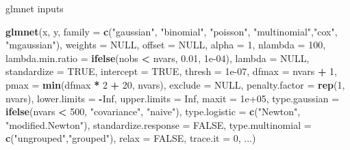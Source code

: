 \documentclass[
  ignorenonframetext,
]{beamer}
\newenvironment{Shaded}{\begin{snugshade}}{\end{snugshade}}
\newcommand{\DataTypeTok}[1]{\textcolor[rgb]{0.13,0.29,0.53}{#1}}
\newcommand{\DecValTok}[1]{\textcolor[rgb]{0.00,0.00,0.81}{#1}}
\newcommand{\FloatTok}[1]{\textcolor[rgb]{0.00,0.00,0.81}{#1}}
\newcommand{\KeywordTok}[1]{\textcolor[rgb]{0.13,0.29,0.53}{\textbf{#1}}}
\newcommand{\NormalTok}[1]{#1}
\newcommand{\OperatorTok}[1]{\textcolor[rgb]{0.81,0.36,0.00}{\textbf{#1}}}
\newcommand{\OtherTok}[1]{\textcolor[rgb]{0.56,0.35,0.01}{#1}}
\newcommand{\StringTok}[1]{\textcolor[rgb]{0.31,0.60,0.02}{#1}}
\begin{document}
\begin{frame}[fragile]

\begin{block}{glmnet inputs}

\begin{Shaded}
\begin{Highlighting}[]
\KeywordTok{glmnet}\NormalTok{(x, y, }
 \DataTypeTok{family =} \KeywordTok{c}\NormalTok{(}\StringTok{"gaussian"}\NormalTok{, }\StringTok{"binomial"}\NormalTok{, }\StringTok{"poisson"}\NormalTok{, }\StringTok{"multinomial"}\NormalTok{,}\StringTok{"cox"}\NormalTok{, }\StringTok{"mgaussian"}\NormalTok{),}
 \DataTypeTok{weights =} \OtherTok{NULL}\NormalTok{, }\DataTypeTok{offset =} \OtherTok{NULL}\NormalTok{, }\DataTypeTok{alpha =} \DecValTok{1}\NormalTok{, }\DataTypeTok{nlambda =} \DecValTok{100}\NormalTok{, }
 \DataTypeTok{lambda.min.ratio =} \KeywordTok{ifelse}\NormalTok{(nobs }\OperatorTok{<}\StringTok{ }\NormalTok{nvars, }\FloatTok{0.01}\NormalTok{, }\FloatTok{1e-04}\NormalTok{),}
 \DataTypeTok{lambda =} \OtherTok{NULL}\NormalTok{, }\DataTypeTok{standardize =} \OtherTok{TRUE}\NormalTok{, }\DataTypeTok{intercept =} \OtherTok{TRUE}\NormalTok{,}
 \DataTypeTok{thresh =} \FloatTok{1e-07}\NormalTok{, }\DataTypeTok{dfmax =}\NormalTok{ nvars }\OperatorTok{+}\StringTok{ }\DecValTok{1}\NormalTok{, }
 \DataTypeTok{pmax =} \KeywordTok{min}\NormalTok{(dfmax }\OperatorTok{*}\StringTok{ }\DecValTok{2} \OperatorTok{+}\StringTok{ }\DecValTok{20}\NormalTok{, nvars), }
 \DataTypeTok{exclude =} \OtherTok{NULL}\NormalTok{, }\DataTypeTok{penalty.factor =} \KeywordTok{rep}\NormalTok{(}\DecValTok{1}\NormalTok{, nvars),}
 \DataTypeTok{lower.limits =} \OperatorTok{-}\OtherTok{Inf}\NormalTok{, }\DataTypeTok{upper.limits =} \OtherTok{Inf}\NormalTok{, }\DataTypeTok{maxit =} \FloatTok{1e+05}\NormalTok{,}
 \DataTypeTok{type.gaussian =} \KeywordTok{ifelse}\NormalTok{(nvars }\OperatorTok{<}\StringTok{ }\DecValTok{500}\NormalTok{, }\StringTok{"covariance"}\NormalTok{, }\StringTok{"naive"}\NormalTok{),}
 \DataTypeTok{type.logistic =} \KeywordTok{c}\NormalTok{(}\StringTok{"Newton"}\NormalTok{, }\StringTok{"modified.Newton"}\NormalTok{),}
 \DataTypeTok{standardize.response =} \OtherTok{FALSE}\NormalTok{, }
 \DataTypeTok{type.multinomial =} \KeywordTok{c}\NormalTok{(}\StringTok{"ungrouped"}\NormalTok{,}\StringTok{"grouped"}\NormalTok{), }
 \DataTypeTok{relax =} \OtherTok{FALSE}\NormalTok{, }\DataTypeTok{trace.it =} \DecValTok{0}\NormalTok{, ...)}
\end{Highlighting}
\end{Shaded}

\end{block}

\end{frame}
\end{document}
